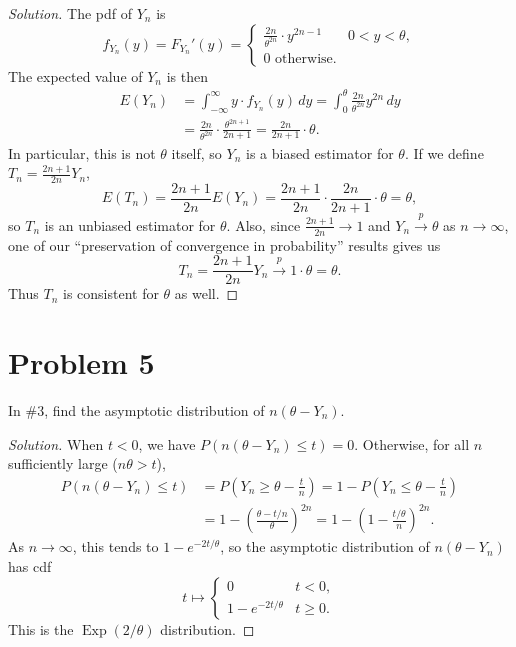 \documentclass{article}
\begin{document}
\begin{proof}[Solution]
The pdf of $Y_n$ is
\begin{equation*}
f_{Y_n}(y) = F_{Y_n}'(y) = \begin{cases} \frac{2n}{\theta^{2n}}\cdot y^{2n - 1} & 0 < y < \theta, \\ 0 \text{ otherwise}. \end{cases}
\end{equation*}
The expected value of $Y_n$ is then
\begin{align*}
E(Y_n) &= \int_{-\infty}^{\infty} y\cdot f_{Y_n}(y)\,dy = \int_0^{\theta} \frac{2n}{\theta^{2n}} y^{2n}\,dy \\
&= \frac{2n}{\theta^{2n}}\cdot\frac{\theta^{2n + 1}}{2n + 1} = \frac{2n}{2n + 1}\cdot\theta.
\end{align*}
In particular, this is not $\theta$ itself, so $Y_n$ is a biased estimator for $\theta$. If we define $\boxed{T_n = \frac{2n + 1}{2n}Y_n}$,
\begin{equation*}
E(T_n) = \frac{2n + 1}{2n}E(Y_n) = \frac{2n + 1}{2n}\cdot\frac{2n}{2n + 1}\cdot\theta = \theta,
\end{equation*}
so $T_n$ is an unbiased estimator for $\theta$. Also, since $\frac{2n + 1}{2n}\to 1$ and $Y_n\stackrel{p}{\to}\theta$ as $n\to\infty$, one of our ``preservation of convergence in probability'' results gives us
\begin{equation*}
T_n = \frac{2n + 1}{2n}Y_n\stackrel{p}{\longrightarrow} 1\cdot\theta = \theta.
\end{equation*}
Thus $T_n$ is consistent for $\theta$ as well.
\end{proof}


\section*{Problem 5}
In \#3, find the asymptotic distribution of $n(\theta - Y_n)$.

\begin{proof}[Solution]
When $t < 0$, we have $P(n(\theta - Y_n)\leq t) = 0$. Otherwise, for all $n$ sufficiently large ($n\theta > t$),
\begin{align*}
P(n(\theta - Y_n)\leq t) &= P\left(Y_n\geq\theta - \frac{t}{n}\right) = 1 - P\left(Y_n\leq\theta - \frac{t}{n}\right) \\
&= 1 - \left(\frac{\theta - t/n}{\theta}\right)^{2n} = 1 - \left(1 - \frac{t/\theta}{n}\right)^{2n}.
\end{align*}
As $n\to\infty$, this tends to $1 - e^{-2t/\theta}$, so the asymptotic distribution of $n(\theta - Y_n)$ has cdf
\begin{equation*}
t\longmapsto \begin{cases} 0 & t < 0, \\ 1 - e^{-2t/\theta} & t\geq 0. \end{cases}
\end{equation*}
This is the $\boxed{\operatorname{Exp}(2/\theta)}$ distribution.
\end{proof}
\end{document}
